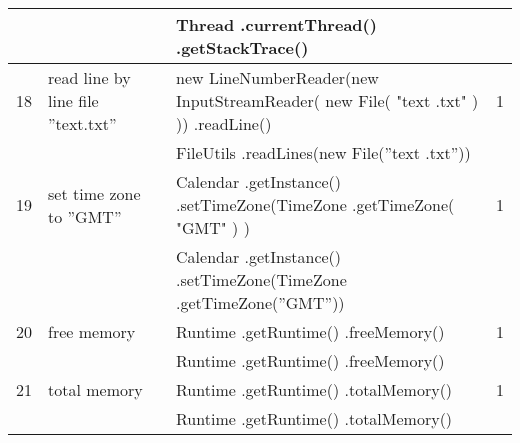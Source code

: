 \begin{longtable}{|p{}|p{}|p{}|p{}|}
		\rowcolor[HTML]{9AFF99} 
		&                                                        & Thread .currentThread() .getStackTrace()                                                                         &                                         \\ \hline
		\rowcolor[HTML]{FFCCC9} 
		18                                & read line by line file ”text.txt”                      & new LineNumberReader(new InputStreamReader( new File( "text .txt" ) )) .readLine()                               & 1                                       \\ \hline
		\rowcolor[HTML]{9AFF99} 
		&                                                        & FileUtils .readLines(new File(”text .txt”))                                                                      &                                         \\ \hline
		\rowcolor[HTML]{FFCCC9} 
		19                                & set time zone to ”GMT”                                 & Calendar .getInstance() .setTimeZone(TimeZone .getTimeZone( "GMT" ) )                                            & 1                                       \\ \hline
		\rowcolor[HTML]{9AFF99} 
		&                                                        & Calendar .getInstance() .setTimeZone(TimeZone .getTimeZone(”GMT”))                                               &                                         \\ \hline
		\rowcolor[HTML]{FFCCC9} 
		20                                & free memory                                            & Runtime .getRuntime() .freeMemory()                                                                              & 1                                       \\ \hline
		\rowcolor[HTML]{9AFF99} 
		&                                                        & Runtime .getRuntime() .freeMemory()                                                                              &                                         \\ \hline
		\rowcolor[HTML]{FFCCC9} 
		21                                & total memory                                           & Runtime .getRuntime() .totalMemory()                                                                             & 1                                       \\ \hline
		\rowcolor[HTML]{9AFF99} 
		&                                                        & Runtime .getRuntime() .totalMemory()                                                                             &                                         \\ \hline

\end{longtable}
